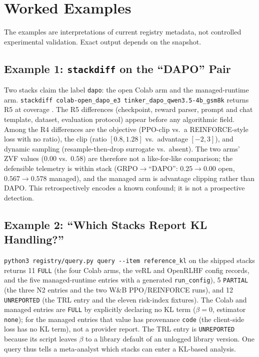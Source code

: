 \section{Worked Examples}
\label{sec:p6-worked}
The examples are interpretations of current registry metadata, not
controlled experimental validation. Exact output depends on the snapshot.

\subsection{Example 1: \texttt{stackdiff} on the ``DAPO'' Pair}
\label{sec:p6-worked-dapo}
Two stacks claim the label \texttt{dapo}: the open Colab arm and the
managed-runtime arm. \texttt{stackdiff colab-open\_dapo\_e3
tinker\_dapo\_qwen3.5-4b\_gsm8k} returns R5 at coverage \STACKDIFFCOVB{}. The R5
differences (checkpoint, reward parser, prompt and chat template, dataset,
evaluation protocol) appear before any algorithmic field. Among the R4
differences are the objective (PPO-clip vs.\ a REINFORCE-style loss with no
ratio), the clip (ratio $[0.8,1.28]$ vs.\
advantage $[-2,3]$), and dynamic sampling (resample-then-drop surrogate vs.\
absent). The two arms' ZVF values ($0.00$ vs.\ $0.58$) are therefore not a
like-for-like comparison; the defensible telemetry is within stack
(GRPO$\to$``DAPO'': $0.25\to0.00$ open, $0.567\to0.578$ managed), and the
managed arm is advantage clipping rather than DAPO. This retrospectively
encodes a known confound; it is not a prospective detection.

\subsection{Example 2: ``Which Stacks Report KL Handling?''}
\label{sec:p6-worked-kl}
\texttt{python3 registry/query.py query -{}-item reference\_kl} on the
\NSTACK{} shipped stacks returns 11 \texttt{FULL} (the four Colab arms, the
veRL and OpenRLHF config records, and the five managed-runtime entries with a
generated \texttt{run\_config}), 5 \texttt{PARTIAL} (the three N2 entries and
the two W\&B PPO/REINFORCE runs), and 12 \texttt{UNREPORTED} (the TRL entry
and the eleven risk-index fixtures). The Colab and managed entries are
\texttt{FULL} by explicitly declaring no KL term ($\beta{=}0$, estimator
\texttt{none}); for the managed entries that value has provenance
\texttt{code} (the client-side loss has no KL term), not a provider report.
The TRL entry is \texttt{UNREPORTED} because its script leaves $\beta$ to a
library default of an unlogged library version. One query thus tells a
meta-analyst which stacks can enter a KL-based analysis.

